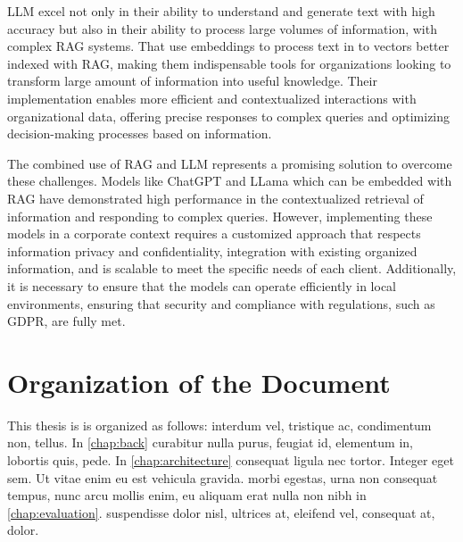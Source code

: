 \ac{LLM} excel not only in their ability to understand and generate text with high accuracy but also in their ability to process large volumes of information, with complex \ac{RAG} systems. That use embeddings to process text in to vectors better indexed with \ac{RAG}, making them indispensable tools for organizations looking to transform large amount of information into useful knowledge. Their implementation enables more efficient and contextualized interactions with organizational data, offering precise responses to complex queries and optimizing decision-making processes based on information.

The combined use of \ac{RAG} and \ac{LLM} represents a promising solution to overcome these challenges. Models like ChatGPT and LLama which can be embedded with \ac{RAG} have demonstrated high performance in the contextualized retrieval of information and responding to complex queries. However, implementing these models in a corporate context requires a customized approach that respects information privacy and confidentiality, integration with existing organized information, and is scalable to meet the specific needs of each client. Additionally, it is necessary to ensure that the models can operate efficiently in local environments, ensuring that security and compliance with regulations, such as \ac{GDPR}, are fully met.


\section{Organization of the Document}
This thesis is is organized as follows:  interdum vel, tristique ac, condimentum non, tellus. 
In \cref{chap:back} curabitur nulla purus, feugiat id, elementum in, lobortis quis, pede.
In \cref{chap:architecture} consequat ligula nec tortor. Integer eget sem. Ut vitae enim eu est vehicula gravida.
 morbi egestas, urna non consequat tempus, nunc arcu mollis enim, eu aliquam erat nulla non nibh in \cref{chap:evaluation}.
 suspendisse dolor nisl, ultrices at, eleifend vel, consequat at, dolor.